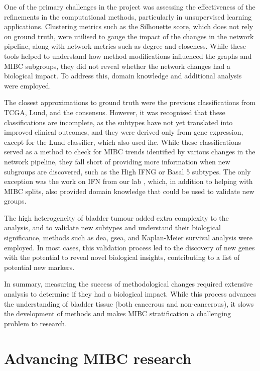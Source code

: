 One of the primary challenges in the project was assessing the effectiveness of the refinements in the computational methods, particularly in unsupervised learning applications. Clustering metrics such as the Silhouette score, which does not rely on ground truth, were utilised to gauge the impact of the changes in the network pipeline, along with network metrics such as degree and closeness. While these tools helped to understand how method modifications influenced the graphs and \gls{MIBC} subgroups, they did not reveal whether the network changes had a biological impact. To address this, domain knowledge and additional analysis were employed.


The closest approximations to ground truth were the previous classifications from TCGA, Lund, and the consensus. However, it was recognised that these classifications are incomplete, as the subtypes have not yet translated into improved clinical outcomes, and they were derived only from gene expression, except for the Lund classifier, which also used \acrlong{ihc}. While these classifications served as a method to check for MIBC trends identified by various changes in the network pipeline, they fall short of providing more information when new subgroups are discovered, such as the High IFNG or Basal 5 subtypes. The only exception was the work on \gls{IFN} from our lab \citep{Baker2022-bj}, which, in addition to helping with MIBC splits, also provided domain knowledge that could be used to validate new groups.

The high heterogeneity of bladder tumour added extra complexity to the analysis, and to validate new subtypes and understand their biological significance, methods such as \acrlong{dea}, \acrlong{gsea}, and Kaplan-Meier survival analysis were employed. In most cases, this validation process led to the discovery of new genes with the potential to reveal novel biological insights, contributing to a list of potential new markers. 

In summary, measuring the success of methodological changes required extensive analysis to determine if they had a biological impact. While this process advances the understanding of bladder tissue (both cancerous and non-cancerous), it slows the development of methods and makes MIBC stratification a challenging problem to research.

\section{Advancing MIBC research}

